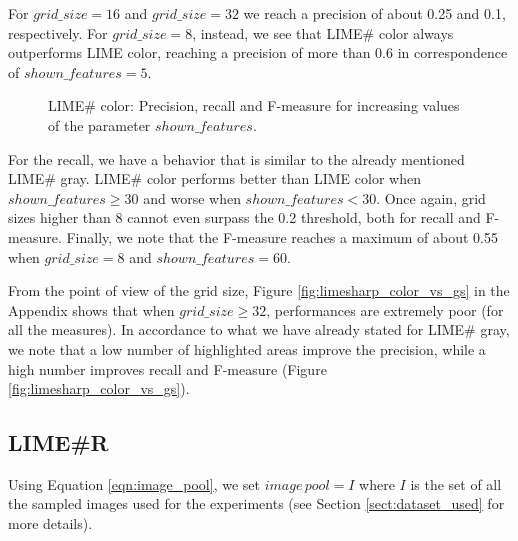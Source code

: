 \documentclass[12pt, twoside, a4paper]{report}
\begin{document}
For $grid\_size = 16$ and $grid\_size = 32$ we reach a precision of about 0.25 and 0.1, respectively. For $grid\_size = 8$, instead, we see that LIME\# color always outperforms LIME color, reaching a precision of more than 0.6 in correspondence of $shown\_features = 5$.

\begin{figure}
\centering
{}
\caption{LIME\# color: Precision, recall and F-measure for increasing values of the parameter $shown\_features$.}
\label{subfig:limesharp_color_vs_sf}
\end{figure}

For the recall, we have a behavior that is similar to the already mentioned LIME\# gray. LIME\# color performs better than LIME color when $shown\_features \geq 30$ and worse when $shown\_features < 30$. Once again, grid sizes higher than 8 cannot even surpass the 0.2 threshold, both for recall and F-measure. 
Finally, we note that the F-measure reaches a maximum of about 0.55 when $grid\_size = 8$ and $shown\_features = 60$. 
\bigskip

From the point of view of the grid size, Figure \ref{fig:limesharp_color_vs_gs} in the Appendix shows that when $grid\_size \geq 32$, performances are extremely poor (for all the measures). 
In accordance to what we have already stated for LIME\# gray, we note that a low number of highlighted areas improve the precision, while a high number improves recall and F-measure (Figure \ref{fig:limesharp_color_vs_gs}). 

\subsection{LIME\#R}\label{sect:limesharpR_expe}

Using Equation \ref{eqn:image_pool}, we set $image\,pool = I$ where $I$ is the set of all the sampled images used for the experiments (see Section \ref{sect:dataset_used} for more details). 
\end{document}
